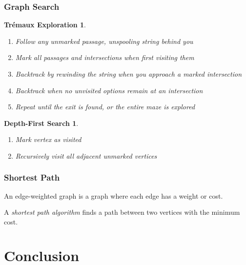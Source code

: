 \documentclass{beamer}
\theoremstyle{Plain}\newtheorem{kt}{Kuratowski's Theorem}
\theoremstyle{Definition}\newtheorem{te}{Tr\'emaux Exploration}
\theoremstyle{Definition}\newtheorem{dfs}{Depth-First Search}
\begin{document}
\begin{frame}
  \frametitle{Graph Search}
    \begin{te}
    \begin{enumerate}
      \item Follow any unmarked passage, unspooling string behind you
      \item Mark all passages and intersections when first visiting them
      \item Backtrack by rewinding the string when you approach a marked intersection
      \item Backtrack when no unvisited options remain at an intersection
      \item Repeat until the exit is found, or the entire maze is explored
    \end{enumerate}
    \end{te}
    \pause

    \begin{dfs}
    \begin{enumerate}
      \item Mark vertex as visited
      \item Recursively visit all adjacent unmarked vertices
    \end{enumerate}
    \end{dfs}
\end{frame}

\begin{frame}
  \frametitle{Shortest Path}
  An \alert{edge-weighted graph} is a graph where each edge has a weight or cost.
  \begin{figure}
  \end{figure}
  A \emph{shortest path algorithm} finds a path between two vertices with the minimum cost.
\end{frame}

\section{Conclusion}
\end{document}
